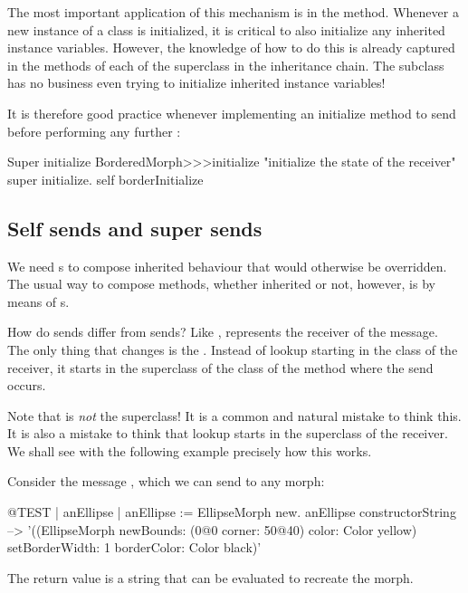 \documentclass[a4paper,10pt,twoside]{book}
\begin{document}
The most important application of this mechanism is in the  method.
Whenever a new instance of a class is initialized, it is critical to also initialize any inherited instance variables.
However, the knowledge of how to do this is already captured in the  methods of each of the superclass in the inheritance chain.
The subclass has no business even trying to initialize inherited instance variables!

It is therefore good practice whenever implementing an initialize method to send  before performing any further :

\begin{method}[morphinit]{Super initialize}
BorderedMorph>>>initialize
	"initialize the state of the receiver"
	super initialize.
	self borderInitialize
\end{method}


\subsection{Self sends and super sends}

We need \super {}s to compose inherited behaviour that would otherwise be overridden.
The usual way to compose methods, whether inherited or not, however, is by means of \self {}s.

How do \self sends differ from \super sends?
Like \self, \super represents the receiver of the message.
The only thing that changes is the .
Instead of lookup starting in the class of the receiver, it starts in the superclass of the class of the method where the \super send occurs.

Note that \super is \emph{not} the superclass!
It is a common and natural mistake to think this.
It is also a mistake to think that lookup starts in the superclass of the receiver.
We shall see with the following example precisely how this works.

Consider the message , which we can send to any morph:
\begin{code}{@TEST | anEllipse | anEllipse := EllipseMorph new.}
anEllipse constructorString --> '((EllipseMorph newBounds: (0@0 corner: 50@40) color: Color yellow) setBorderWidth: 1 borderColor: Color black)'
\end{code}
The return value is a string that can be evaluated to recreate the morph.
\end{document}
